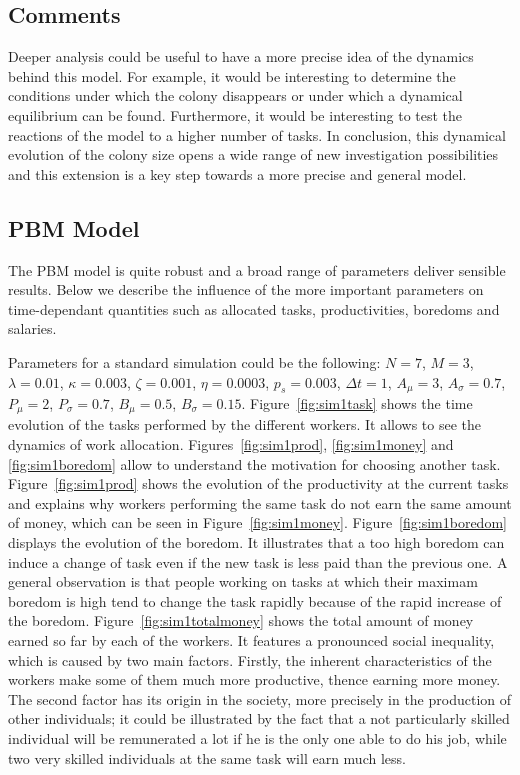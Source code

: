 \subsection{Comments}

Deeper analysis could be useful to have a more precise idea of the
dynamics behind this model. For example, it would be interesting to
determine the conditions under which the colony disappears or under
which a dynamical equilibrium can be found. Furthermore, it would
be interesting to test the reactions of the model to a higher number
of tasks. In conclusion, this dynamical evolution of the colony size
opens a wide range of new investigation possibilities and this extension
is a key step towards a more precise and general model.
%

 

\subsection{PBM Model}
The PBM model is quite robust and a broad range of parameters deliver sensible results. Below we describe the influence of the more important parameters on time-dependant quantities such as allocated tasks, productivities, boredoms and salaries. 

Parameters for a standard simulation could be the following: $N=7$, $M=3$, $\lambda=0.01$, $\kappa=0.003$, $\zeta=0.001$, $\eta=0.0003$, $p_s=0.003$, $\Delta t=1$, $A_\mu=3$, $A_\sigma=0.7$, $P_\mu=2$, $P_\sigma=0.7$, $B_\mu=0.5$, $B_\sigma=0.15$. Figure~\ref{fig:sim1task} shows the time evolution of the tasks performed by the different workers. It allows to see the dynamics of work allocation. Figures~\ref{fig:sim1prod}, \ref{fig:sim1money} and \ref{fig:sim1boredom} allow to understand the motivation for choosing another task. Figure~\ref{fig:sim1prod} shows the evolution of the productivity at the current tasks and explains why workers performing the same task do not earn the same amount of money, which can be seen in Figure~\ref{fig:sim1money}. Figure~\ref{fig:sim1boredom} displays the evolution of the boredom. It illustrates that a too high boredom can induce a change of task even if the new task is less paid than the previous one. A general observation is that people working on tasks at which their maximam boredom is high tend to change the task rapidly because of the rapid increase of the boredom. Figure~\ref{fig:sim1totalmoney} shows the total amount of money earned so far by each of the workers. It features a pronounced social inequality, which is caused by two main factors. Firstly, the inherent characteristics of the workers make some of them much more productive, thence earning more money. The second factor has its origin in the society, more precisely in the production of other individuals; it could be illustrated by the fact that a not particularly skilled individual will be remunerated a lot if he is the only one able to do his job, while two very skilled individuals at the same task will earn much less.

